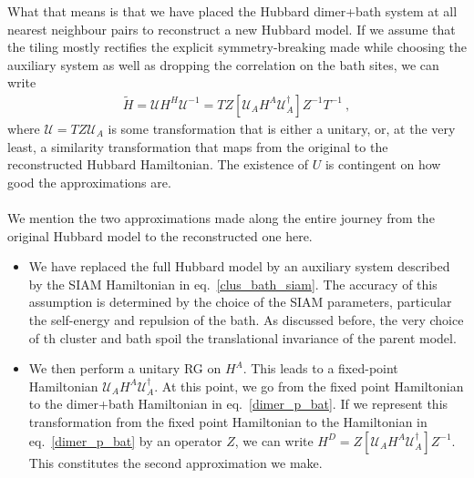 \documentclass{article}
\numberwithin{equation}{section}
\begin{document}
What that means is that we have placed the Hubbard dimer+bath system at all nearest neighbour pairs to reconstruct a new Hubbard model. If we assume that the tiling mostly rectifies the explicit symmetry-breaking made while choosing the auxiliary system as well as dropping the correlation on the bath sites, we can write
\begin{equation}\begin{aligned}
	\label{app2}
	\tilde H = \mathcal{U} H^H \mathcal{U}^{-1} = TZ\left[\mathcal{U}_A H^A \mathcal{U}_A^\dagger \right]Z^{-1} T^{-1}~,
\end{aligned}\end{equation}
where $\mathcal{U} = TZ\mathcal{U}_{A}$ is some transformation that is either a unitary, or, at the very least, a similarity transformation that maps from the original to the reconstructed Hubbard Hamiltonian. 
The existence of $U$ is contingent on how good the approximations are.
\\\\
We mention the two approximations made along the entire journey from the original Hubbard model to the reconstructed one here.
\begin{itemize}
	\item We have replaced the full Hubbard model by an auxiliary system described by the SIAM Hamiltonian in eq.~\ref{clus_bath_siam}. The accuracy of this assumption is determined by the choice of the SIAM parameters, particular the self-energy and repulsion of the bath. As discussed before, the very choice of th cluster and bath spoil the translational invariance of the parent model.
	\item We then perform a unitary RG on $H^A$. This leads to a fixed-point Hamiltonian $\mathcal{U}_A H^A \mathcal{U}_A^\dagger$. At this point, we go from the fixed point Hamiltonian to the dimer+bath Hamiltonian in eq.~\ref{dimer_p_bat}. If we represent this transformation from the fixed point Hamiltonian to the Hamiltonian in eq.~\ref{dimer_p_bat} by an operator \(Z\), we can write $H^D = Z\left[\mathcal{U}_A H^A \mathcal{U}_A^\dagger \right] Z^{-1}$. This constitutes the second approximation we make.
\end{itemize}
\end{document}
